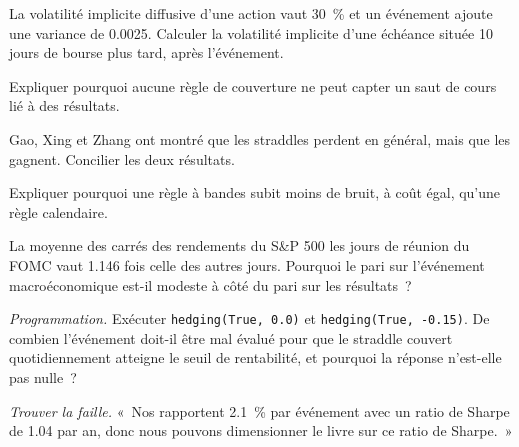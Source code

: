 \begin{exercise}[$\star$]\label{exo:s2:gamma-scalping-and-event-volatility:2}
La volatilité implicite diffusive d'une action vaut 30~\% et un événement ajoute une variance de 0.0025. Calculer la volatilité implicite d'une échéance située 10 jours de bourse plus tard, après l'événement.
\end{exercise}

\begin{exercise}[$\star$]\label{exo:s2:gamma-scalping-and-event-volatility:3}
Expliquer pourquoi aucune règle de couverture ne peut capter un saut de cours lié à des résultats.
\end{exercise}

\begin{exercise}[$\star\star$]\label{exo:s2:gamma-scalping-and-event-volatility:4}
Gao, Xing et Zhang ont montré que les straddles perdent en général, mais que les  gagnent. Concilier les deux résultats.
\end{exercise}

\begin{exercise}[$\star\star$]\label{exo:s2:gamma-scalping-and-event-volatility:5}
Expliquer pourquoi une règle à bandes subit moins de bruit, à coût égal, qu'une règle calendaire.
\end{exercise}

\begin{exercise}[$\star\star$]\label{exo:s2:gamma-scalping-and-event-volatility:6}
La moyenne des carrés des rendements du S\&P 500 les jours de réunion du FOMC vaut 1.146 fois celle des autres jours. Pourquoi le pari sur l'événement macroéconomique est-il modeste à côté du pari sur les résultats~?
\end{exercise}

\begin{exercise}[$\star\star\star$]\label{exo:s2:gamma-scalping-and-event-volatility:7}
\emph{Programmation.} Exécuter \texttt{hedging(True, 0.0)} et \texttt{hedging(True, -0.15)}. De combien l'événement doit-il être mal évalué pour que le straddle
couvert quotidiennement atteigne le seuil de rentabilité, et pourquoi la réponse n'est-elle pas nulle~?
\end{exercise}

\begin{exercise}[$\star\star\star$]\label{exo:s2:gamma-scalping-and-event-volatility:8}
\emph{Trouver la faille.} «~Nos  rapportent 2.1~\% par événement avec un ratio de Sharpe de 1.04 par an, donc nous pouvons dimensionner le livre sur ce ratio de Sharpe.~»
\end{exercise}

